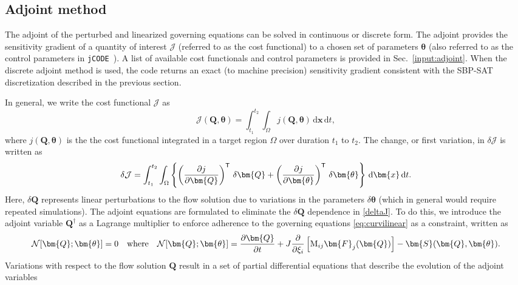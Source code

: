\documentclass[12pt]{article}
\newcommand{\code}[1]{\texttt{#1}}
\newcommand{\jcode}{\code{jCODE}~}
\begin{document}
\subsection{Adjoint method}
The adjoint of the perturbed and linearized governing equations can be solved in continuous or discrete form. The adjoint provides the sensitivity gradient of a quantity of interest $\mathcal{J}$ (referred to as the cost functional) to a chosen set of parameters $\bm{\theta}$ (also referred to as the control parameters in \jcode). A list of available cost functionals and control parameters is provided in Sec.~\ref{input:adjoint}. When the discrete adjoint method is used, the code returns an exact (to machine precision) sensitivity gradient consistent with the SBP-SAT discretization described in the previous section.

In general, we write the cost functional $\mathcal{J}$ as
\begin{equation}\label{Jdef}
\mathcal{J}(\bm{Q},\bm{\theta}) = \int_{t_1}^{t_2} \int_{\Omega} j(\bm{Q},\bm{\theta}) \, \text{d}\bm{x} \, \text{d} t,
\end{equation}
where $j(\bm{Q},\bm{\theta})$ is the the cost functional integrated in a target region $\Omega$ over duration $t_1$ to $t_2$. The change, or first variation, in $\delta\mathcal{J}$ is written as
\begin{equation}
\label{deltaJ}
\delta\mathcal{J}=\int_{t_1}^{t_2} \int_{\Omega} \left\{\left(\frac{\partial j}{\partial \bm{Q}}\right)^{\sf T} \, \delta \bm{Q} + \left(\frac{\partial j}{\partial \bm{\theta}}\right)^{\sf T} \, \delta \bm{\theta}\right\} \, \textrm{d}\bm{x} \, \textrm{d} t.
\end{equation}
Here, $\delta \bm{Q}$ represents linear perturbations to the flow solution due to variations in the parameters $\delta\bm{\theta}$ (which in general would require repeated simulations). The adjoint equations are formulated to eliminate the $\delta \bm{Q}$ dependence in \eqref{deltaJ}. To do this, we introduce the adjoint variable $\bm{Q}^\dagger$ as a Lagrange multiplier to enforce adherence to the governing equations \eqref{eq:curvilinear} as a constraint, written as
\begin{equation}
\mathcal{N}[\bm{Q};\bm{\theta}] = 0 \quad \text{where} \quad \mathcal{N}[\bm{Q};\bm{\theta}] = \frac{\partial\bm{Q}}{\partial t} + J \frac{\partial}{\partial \xi_i}\left[{\rm M}_{ij}\bm{F}_j(\bm{Q})\right] - \bm{S}(\bm{Q}, \bm{\theta}).
\label{vecN}
\end{equation}
Variations with respect to the flow solution $\bm{Q}$ result in a set of partial differential equations that describe the evolution of the adjoint variables
\end{document}
